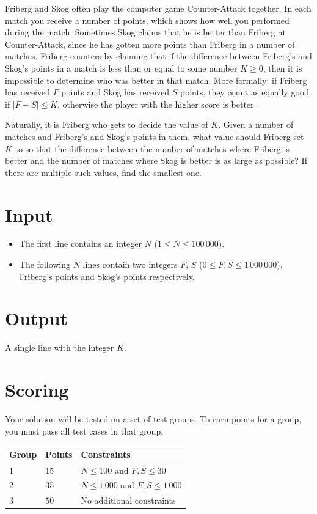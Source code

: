 
Friberg and Skog often play the computer game Counter-Attack together. In each match you receive a number of points, which shows how well you performed during the match. Sometimes Skog claims that he is better than Friberg at Counter-Attack, since he has gotten more points than Friberg in a number of matches. Friberg counters by claiming that if the difference between Friberg's and Skog's points in a match is less than or equal to some number $K\ge 0$, then it is impossible to determine who was better in that match. More formally: if Friberg has received $F$ points and Skog has received $S$ points, they count as equally good if $|F - S| \le K$, otherwise the player with the higher score is better.

Naturally, it is Friberg who gets to decide the value of $K$. Given a number of matches and Friberg's and Skog's points in them, what value should Friberg set $K$ to so that the difference between the number of matches where Friberg is better and the number of matches where Skog is better is as large as possible? If there are multiple such values, find the smallest one.

\section*{Input}
\begin{itemize}
  \item The first line contains an integer $N$ ($1 \le N \le 100\,000$).

  \item The following $N$ lines contain two integers $F$, $S$ ($0 \le F, S \le 1\,000\,000$), Friberg's points and Skog's points respectively.

\end{itemize}

\section*{Output}
A single line with the integer $K$.

\section*{Scoring}
Your solution will be tested on a set of test groups.
To earn points for a group, you must pass all test cases in that group.


\noindent
\begin{tabular}{| l | l | l |}
  \hline
  Group & Points & Constraints \\ \hline
  $1$    & $15$      & $N \le 100$ and $F,S\le 30$ \\ \hline
  $2$    & $35$      & $N \le 1\,000$ and $F,S\le 1\,000$\\ \hline
  $3$    & $50$      & No additional constraints \\ \hline
\end{tabular}
